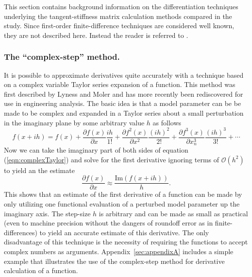 \documentclass[preprint,12pt]{elsarticle}
\begin{document}
This section contains background information on the differentiation techniques underlying the tangent-stiffness matrix calculation methods compared in the study. Since first-order finite-difference techniques are considered well known, they are not described here. Instead the reader is referred to \cite[Chap. 4.1.3]{chapra2010}.

\subsubsection{The ``complex-step'' method.}  
\label{sec:CSmethod}
It is possible to approximate derivatives quite accurately with a technique based on a complex variable Taylor series expansion of a function.  This method was first described by Lyness and Moler \cite{lyness1967numerical, lyness1968differentiation} and has more recently been rediscovered \cite{squire1998using, voorhees2011complex, al2010complex} for use in engineering analysis.  The basic idea is that a model parameter can be be made to be complex and expanded in a Taylor series about a small perturbation in the imaginary plane by some arbitrary value $h$ as follows
%
\begin{equation}
f ( x + i h ) = f (x) + \frac{\partial f(x)}{\partial x} \frac{i h}{1!} + \frac{\partial f^2(x)}{\partial x^2} \frac{(i h)^2}{2!} + \frac{\partial f^3(x)}{\partial x_n^3} \frac{(i h)^3}{3!} + \cdots
\label{eqn:complexTaylor}
\end{equation}
%
Now we can take the imaginary part of both sides of equation (\ref{eqn:complexTaylor}) and solve for the first derivative ignoring terms of $\mathcal{O}\left ( h^2 \right)$ to yield an the estimate
%
\begin{equation}
 \frac{\partial f( x )}{\partial x} \approx \frac{\mbox{Im} \left( f (x + i h) \right)}{h}.
\label{eqn:complexFirstDeriv}
\end{equation}
%
This shows that an estimate of the first derivative of a function can be made by only utilizing one functional evaluation of a perturbed model parameter up the imaginary axis.  The step-size $h$ is arbitrary and can be made as small as practical (even to machine precision without the dangers of roundoff error as in finite-differences) to yield an accurate estimate of this derivative.  The only disadvantage of this technique is the necessity of requiring the functions to accept complex numbers as arguments. Appendix~\ref{sec:appendixA} includes a simple example that illustrates the use of the complex-step method for derivative calculation of a function. 
\end{document}
